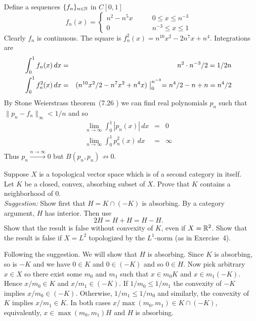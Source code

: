 \begin{enumerate}
Define a sequences \(\{f_n\}_{n\in\mathbb{N}}\) in \(C[0,1]\)
\begin{equation*}
f_n(x) = \left\{%
  \begin{array}{ll}
  n^2 - n^5x & \qquad 0 \leq x \leq  n^{-3} \\
  0          & \qquad n^{-3} \leq x \leq 1
  \end{array}\right.
\end{equation*}
Clearly \(f_n\) is continuous. The square is
\(f_n^2(x) = n^{10}x^2 - 2n^7x + n^4\). Integrations are
\begin{eqnarray*}
\int_0^1 f_n(x)\,dx &=& n^2\cdot n^{-3}/2 = 1/2n \\ 
\int_0^1 f_n^2(x)\,dx 
  &=& (n^{10}x^2/2 - n^7x^2 + n^4x)\bigm|_0^{n^{-3}} 
   =  n^4/2 - n + n = n^4/2
\end{eqnarray*}
By 
Stone Weierstrass theorem~(7.26 \cite{RudinPMA85})
we can find real polynomials \(p_n\) such that \(\|p_n - f_n\|_\infty < 1/n\)
and so 
\begin{eqnarray*}
\lim_{n\to\infty} \int_0^1 |p_n(x)|\,dx &=& 0 \\
\lim_{n\to\infty} \int_0^1 p_n^2(x)\,dx &=& \infty \\
\end{eqnarray*}
Thus \(p_n \xrightarrow{n\to\infty} 0\) but \(B(p_n,p_n) \not\to 0\).


\begin{excopy}
Suppose $X$ is a topological vector space which 
is of a second category in itself.
Let $K$ be a closed, convex, absorbing subset of $X$.
Prove that $K$ contains a neighborhood of $0$.\\
\emph{Suggestion:} Show first that \(H= K\cap(-K)\) is absorbing.
By a category argument, $H$ has interior. Then use
\begin{equation*}
  2H = H + H = H - H.
\end{equation*}
Show that the result is false without convexity of $K$, 
even if \(X = \mathbb{R}^2\).
Show that the result is false if \(X = L^2\) topologized by the \(L^1\)-norm
(as in Exercise~4).
\end{excopy}

Following the suggestion. 
We will show that $H$ is absorbing.
Since $K$ is absorbing, so is \(-K\) 
and we have \(0\in K\) and \(0\in (-K)\) and so 
\(0\in H\). Now pick arbitrary \(x\in X\)
so there exist some  \(m_0\) and \(m_1\) such that 
\(x\in m_0 K\) and \(x\in m_1(-K)\).
Hence \(x/m_0 \in K\) and \(x/m_1 \in (-K)\).
If \(1/m_0 \leq 1/m_1\) the convexity of \(-K\) implies \(x/m_0 \in (-K)\).
Otherwise, \(1/m_1 \leq 1/m_0\) and similarly,
the convexity of $K$ implies \(x/m_1 \in K\).
In both cases \(x/\max(m_0,m_1) \in K\cap(-K)\),
equivalently, \(x\in \max(m_0,m_1) H\) and $H$ is absorbing.


\end{enumerate}
